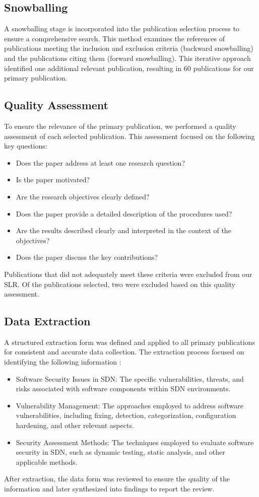 \subsection{Snowballing}
A snowballing stage is incorporated into the publication selection process to ensure a comprehensive search. This method examines the references of publications meeting the inclusion and exclusion criteria (backward snowballing) and the publications citing them (forward snowballing). This iterative approach identified one additional relevant publication, resulting in 60 publications for our primary publication.

\subsection{Quality Assessment}
To ensure the relevance of the primary publication, we performed a quality assessment of each selected publication. This assessment focused on the following key questions:
\begin{itemize} 
\item Does the paper address at least one research question? 
\item Is the paper motivated? 
\item Are the research objectives clearly defined?
\item Does the paper provide a detailed description of the procedures used? 
\item Are the results described clearly and interpreted in the context of the objectives?
\item Does the paper discuss the key contributions? 
\end{itemize}
Publications that did not adequately meet these criteria were excluded from our SLR. Of the publications selected, two were excluded based on this quality assessment.
\subsection{Data Extraction}
A structured extraction form was defined and applied to all primary publications for consistent and accurate data collection. The extraction process focused on identifying the following information :
\begin{itemize} 
\item Software Security Issues in SDN: The specific vulnerabilities, threats, and risks associated with software components within SDN environments.
\item Vulnerability Management: The approaches employed to address software vulnerabilities, including fixing, detection, categorization, configuration hardening, and other relevant aspects.
\item Security Assessment Methods: The techniques employed to evaluate software security in SDN, such as dynamic testing, static analysis, and other applicable methods.
\end{itemize}
After extraction, the data form was reviewed to ensure the quality of the information and later synthesized into findings to report the review.

